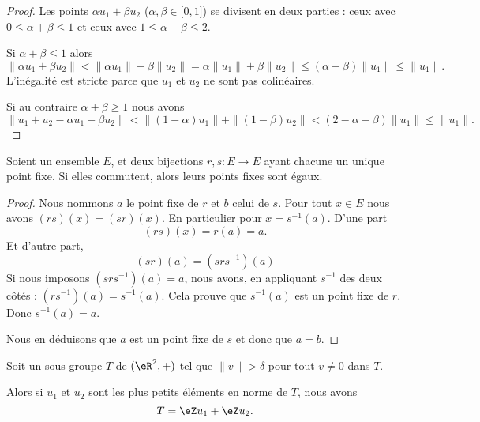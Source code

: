 \begin{proof}
	Les points \( \alpha u_1+\beta u_2\) (\( \alpha,\beta\in \mathopen[ 0 , 1 \mathclose]\)) se divisent en deux parties : ceux avec \( 0\leq\alpha+\beta\leq 1\) et ceux avec \( 1\leq\alpha+\beta\leq 2\).

	Si \( \alpha+\beta\leq 1\) alors
	\begin{equation}
		\| \alpha u_1+\beta u_2 \|<\| \alpha u_1 \|+\beta\| u_2 \|= \alpha\| u_1 \|+\beta\| u_2 \|\leq (\alpha+\beta)\| u_1 \|\leq \| u_1 \|.
	\end{equation}
	L'inégalité est stricte parce que \( u_1\) et \( u_2\) ne sont pas colinéaires.

	Si au contraire \( \alpha+\beta\geq 1\) nous avons
	\begin{equation}
		\| u_1+u_2-\alpha u_1-\beta u_2 \|<\| (1-\alpha)u_1 \|+\| (1-\beta)u_2 \|<(2-\alpha-\beta)\| u_1 \|\leq \| u_1 \|.
	\end{equation}
\end{proof}

\begin{lemma}       \label{LEMooWKTGooQlfuxm}
	Soient un ensemble \( E\), et deux bijections \( r,s\colon E\to E\) ayant chacune un unique point fixe. Si elles commutent, alors leurs points fixes sont égaux.
\end{lemma}

\begin{proof}
	Nous nommons \( a\) le point fixe de \( r\) et \( b\) celui de \( s\). Pour tout \( x\in E\) nous avons \( (rs)(x)=(sr)(x)\). En particulier pour \( x=s^{-1}(a)\). D'une part
	\begin{equation}
		(rs)(x)=r(a)=a.
	\end{equation}
	Et d'autre part,
	\begin{equation}
		(sr)(a)=(srs^{-1})(a)
	\end{equation}
	Si nous imposons \( (srs^{-1})(a)=a\), nous avons, en appliquant \( s^{-1}\) des deux côtés : \( (rs^{-1})(a)=s^{-1}(a)\). Cela prouve que \( s^{-1}(a)\) est un point fixe de \( r\). Donc \( s^{-1}(a)=a\).

	Nous en déduisons que \( a\) est un point fixe de \( s\) et donc que \( a=b\).
\end{proof}

\begin{lemma}       \label{LEMooDGSJooCiBhZz}
	Soit un sous-groupe \( T\) de \( (\eR^2,+)\) tel que \( \| v \|>\delta \) pour tout \( v\neq 0\) dans \( T\).

	Alors si \( u_1\) et \( u_2\) sont les plus petits éléments en norme de \( T\), nous avons
	\begin{equation}
		T=\eZ u_1+\eZ u_2.
	\end{equation}
\end{lemma}

